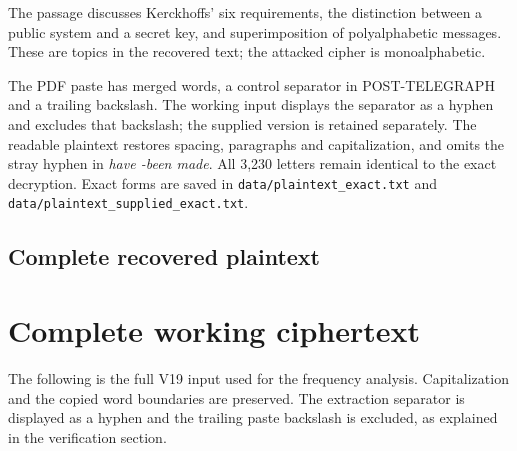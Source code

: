 \documentclass{tum_report}
\begin{document}
The passage discusses Kerckhoffs' six requirements, the distinction between
a public system and a secret key, and superimposition of polyalphabetic
messages. These are topics in the recovered text; the attacked cipher is
monoalphabetic.

The PDF paste has merged words, a control separator in POST-TELEGRAPH and
a trailing backslash. The working input displays the separator as a hyphen
and excludes that backslash; the supplied version is retained separately.
The readable plaintext restores spacing, paragraphs and capitalization,
and omits the stray hyphen in \textit{have -been made}. All 3,230 letters
remain identical to the exact decryption. Exact forms are saved in
\texttt{data/plaintext\_exact.txt} and
\texttt{data/plaintext\_supplied\_exact.txt}.

\clearpage
\section{Complete recovered plaintext}


\clearpage


\clearpage
\appendix
\chapter{Complete working ciphertext}
The following is the full V19 input used for the frequency analysis.
Capitalization and the copied word boundaries are preserved. The extraction
separator is displayed as a hyphen and the trailing paste backslash is
excluded, as explained in the verification section.
{}

\clearpage
{}
{}

\end{document}
